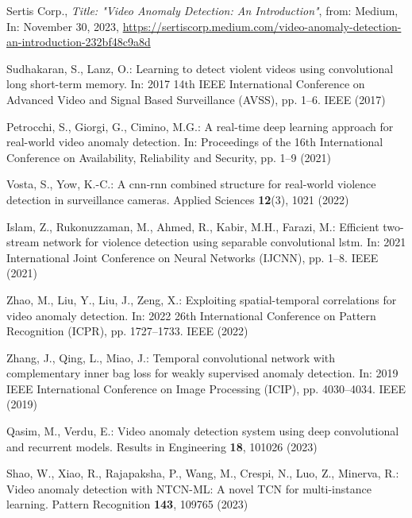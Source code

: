 %
%
%
% 
% 
%
\begin{thebibliography}{99}

Sertis Corp.,
\textit{Title: "Video Anomaly Detection: An Introduction"},
from: Medium,
In: November 30, 2023,
\url{https://sertiscorp.medium.com/video-anomaly-detection-an-introduction-232bf48c9a8d}

Sudhakaran, S., Lanz, O.: Learning to detect violent videos using convolutional long short-term memory. In: 2017 14th IEEE International Conference on Advanced Video and Signal Based Surveillance (AVSS), pp. 1--6. IEEE (2017)

Petrocchi, S., Giorgi, G., Cimino, M.G.: A real-time deep learning approach for real-world video anomaly detection. In: Proceedings of the 16th International Conference on Availability, Reliability and Security, pp. 1--9 (2021)

Vosta, S., Yow, K.-C.: A cnn-rnn combined structure for real-world violence detection in surveillance cameras. Applied Sciences \textbf{12}(3), 1021 (2022)

Islam, Z., Rukonuzzaman, M., Ahmed, R., Kabir, M.H., Farazi, M.: Efficient two-stream network for violence detection using separable convolutional lstm. In: 2021 International Joint Conference on Neural Networks (IJCNN), pp. 1--8. IEEE (2021)

Zhao, M., Liu, Y., Liu, J., Zeng, X.: Exploiting spatial-temporal correlations for video anomaly detection. In: 2022 26th International Conference on Pattern Recognition (ICPR), pp. 1727--1733. IEEE (2022)

Zhang, J., Qing, L., Miao, J.: Temporal convolutional network with complementary inner bag loss for weakly supervised anomaly detection. In: 2019 IEEE International Conference on Image Processing (ICIP), pp. 4030--4034. IEEE (2019)

Qasim, M., Verdu, E.: Video anomaly detection system using deep convolutional and recurrent models. Results in Engineering \textbf{18}, 101026 (2023)

Shao, W., Xiao, R., Rajapaksha, P., Wang, M., Crespi, N., Luo, Z., Minerva, R.: Video anomaly detection with NTCN-ML: A novel TCN for multi-instance learning. Pattern Recognition \textbf{143}, 109765 (2023)


\end{thebibliography}
